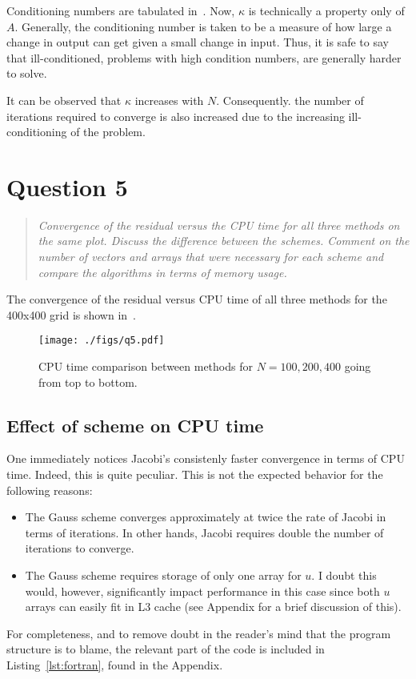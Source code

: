 \documentclass{SelimArticle}
\begin{document}
Conditioning numbers are tabulated in~. Now, $\kappa$ is technically a property
only of $A$. Generally, the conditioning number is taken to be a
measure of how large a change in output can get given a small change in input. Thus, it is safe to say that
ill-conditioned, problems with high condition numbers, are generally harder to solve.

It can be observed that $\kappa$ increases with $N$. Consequently. the number of iterations required to converge
is also increased due to the increasing ill-conditioning of the problem.


\newpage
\section{Question 5}
\begin{quote}
    \textit{Convergence of the residual versus the CPU time for all three methods on the same
        plot. Discuss the difference between the schemes. Comment on the number of vectors
        and arrays that were necessary for each scheme and compare the algorithms in terms
        of memory usage.}
\end{quote}
The convergence of the residual versus CPU time of all three methods for the 400x400 grid is shown
in~.

\begin{figure}
    \centering
    \texttt{[image: ./figs/q5.pdf]}
    \caption{CPU time comparison between methods for $N = 100, 200, 400$ going from top to bottom.}\label{fig:resvscpu}
\end{figure}
\subsection{Effect of scheme on CPU time}
One immediately notices Jacobi's consistenly faster convergence in terms of CPU time. Indeed, this is
quite peculiar. This is not the expected behavior for the following reasons:
\begin{itemize}[noitemsep]
    \item The Gauss scheme converges approximately at twice the rate of Jacobi in terms of iterations. In other hands,
        Jacobi requires double the number of iterations to converge.
    \item The Gauss scheme requires storage of only one array for $u$. I doubt this would, however, significantly
        impact performance in this case since both $u$ arrays can easily fit in L3 cache
        (see Appendix for a brief discussion of this).
\end{itemize}
For completeness, and to remove doubt in the reader's mind that the program structure
is to blame, the relevant part of the code is included in Listing~\ref{lst:fortran}, found in the Appendix.
\end{document}
